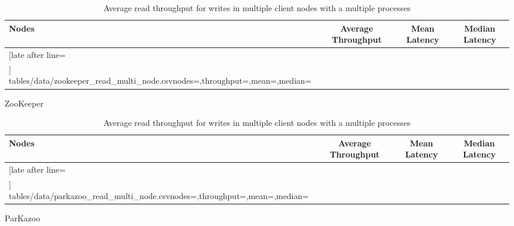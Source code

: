 \begin{table}[ht!]
	\centering
	\begin{subtable}[t]{1.0\linewidth}
		\begin{tabular}{|l|c|c|c|}\hline%
			\textbf{Nodes}   & \textbf{Average Throughput} & \textbf{Mean Latency} & \textbf{Median Latency} \\\hline
			\csvreader[late after line=\\\hline]%
			{tables/data/zookeeper_read_multi_node.csv}{nodes=\nodes,throughput=\throughput,mean=\mean,median=\median}%
			{\nodes & \throughput & \mean & \median}%
		\end{tabular}
		\caption{ZooKeeper}
		\label{table:zookeeper_multinode_read_throughput}
	\end{subtable}
	\begin{subtable}[t]{1.0\linewidth}
		\begin{tabular}{|l|c|c|c|}\hline%
			\textbf{Nodes}   & \textbf{Average Throughput} & \textbf{Mean Latency} & \textbf{Median Latency} \\\hline
			\csvreader[late after line=\\\hline]%
			{tables/data/parkazoo_read_multi_node.csv}{nodes=\nodes,throughput=\throughput,mean=\mean,median=\median}%
			{\nodes & \throughput & \mean & \median}%
		\end{tabular}
		\caption{ParKazoo}
		\label{table:parkazoo_multinode_read_throughput}
	\end{subtable}
	\caption{Average read throughput for writes in multiple client nodes with a multiple processes}
	\label{table:multinode_read_throughput_all}
\end{table}
